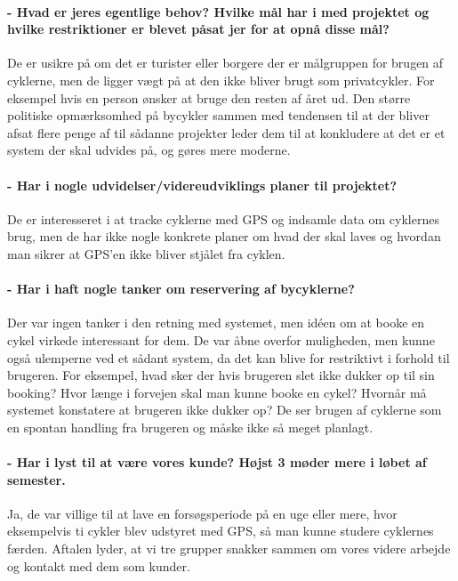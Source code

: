 \paragraph{- Hvad er jeres egentlige behov? Hvilke mål har i med projektet og hvilke restriktioner er blevet påsat jer for at opnå disse mål?}
De er usikre på om det er turister eller borgere der er målgruppen for brugen af cyklerne, men de ligger vægt på at den ikke
bliver brugt som privatcykler. For eksempel hvis en person ønsker at bruge den resten af året ud.
Den større politiske opmærksomhed på bycykler sammen med tendensen til at der bliver afsat flere penge af til sådanne projekter
leder dem til at konkludere at det er et system der skal udvides på, og gøres mere moderne.

\paragraph{- Har i nogle udvidelser/videreudviklings planer til projektet?}
De er interesseret i at tracke cyklerne med GPS og indsamle data om cyklernes brug, men de har ikke nogle konkrete planer om hvad
der skal laves og hvordan man sikrer at GPS'en ikke bliver stjålet fra cyklen.

\paragraph{- Har i haft nogle tanker om reservering af bycyklerne?}
Der var ingen tanker i den retning med systemet, men idéen om at booke en cykel virkede interessant for dem. De var åbne overfor
muligheden, men kunne også ulemperne ved et sådant system, da det kan blive for restriktivt i forhold til brugeren.
For eksempel, hvad sker der hvis brugeren slet ikke dukker op til sin booking? Hvor længe i forvejen skal man kunne booke en cykel?
Hvornår må systemet konstatere at brugeren ikke dukker op?
De ser brugen af cyklerne som en spontan handling fra brugeren og måske ikke så meget planlagt.
 
\paragraph{- Har i lyst til at være vores kunde? Højst 3 møder mere i løbet af semester.}
Ja, de var villige til at lave en forsøgsperiode på en uge eller mere, hvor eksempelvis ti cykler blev udstyret med GPS, så man kunne
studere cyklernes færden.
Aftalen lyder, at vi tre grupper snakker sammen om vores videre arbejde og kontakt med dem som kunder.

